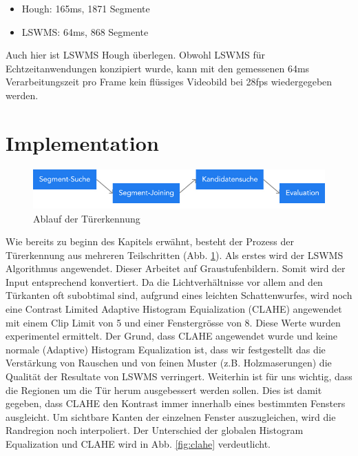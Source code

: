 \begin{itemize}
	\item Hough: 165ms, 1871 Segmente
	\item LSWMS: 64ms, 868 Segmente
\end{itemize}

Auch hier ist LSWMS Hough überlegen. Obwohl LSWMS für Echtzeitanwendungen konzipiert wurde, kann mit den gemessenen 64ms Verarbeitungszeit pro Frame kein flüssiges Videobild bei 28fps wiedergegeben werden.

\section{Implementation}

\begin{figure}[!ht]
\centering
\includegraphics[width=\textwidth]{images/door-detection} 
\caption{Ablauf der Türerkennung}
\label{fig:door-detection}
\end{figure}

Wie bereits zu beginn des Kapitels erwähnt, besteht der Prozess der Türerkennung aus mehreren Teilschritten (Abb. \ref{fig:door-detection}). Als erstes wird der LSWMS Algorithmus angewendet. Dieser Arbeitet auf Graustufenbildern. Somit wird der Input entsprechend konvertiert. Da die Lichtverhältnisse vor allem and den Türkanten oft subobtimal sind, aufgrund eines leichten Schattenwurfes, wird noch eine Contrast Limited Adaptive Histogram Equialization (CLAHE) angewendet mit einem Clip Limit von 5 und einer Fenstergrösse von 8. Diese Werte wurden experimentel ermittelt. Der Grund, dass CLAHE angewendet wurde und keine normale (Adaptive) Histogram Equalization ist, dass wir festgestellt das die Verstärkung von Rauschen und von feinen Muster (z.B. Holzmaserungen) die Qualität der Resultate von LSWMS verringert. Weiterhin ist für uns wichtig, dass die Regionen um die Tür herum ausgebessert werden sollen. Dies ist damit gegeben, dass CLAHE den Kontrast immer innerhalb eines bestimmten Fensters ausgleicht. Um sichtbare Kanten der einzelnen Fenster auszugleichen, wird die Randregion noch interpoliert. Der Unterschied der globalen Histogram Equalization und CLAHE wird in Abb. \ref{fig:clahe} verdeutlicht.

